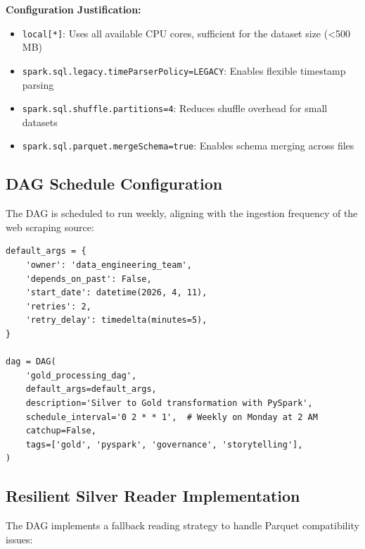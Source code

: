 \documentclass[12pt]{article}
\begin{document}
\textbf{Configuration Justification:}
\begin{itemize}
    \item \texttt{local[*]}: Uses all available CPU cores, sufficient for the dataset size (<500 MB)
    \item \texttt{spark.sql.legacy.timeParserPolicy=LEGACY}: Enables flexible timestamp parsing
    \item \texttt{spark.sql.shuffle.partitions=4}: Reduces shuffle overhead for small datasets
    \item \texttt{spark.sql.parquet.mergeSchema=true}: Enables schema merging across files
\end{itemize}

\subsection{DAG Schedule Configuration}

The DAG is scheduled to run weekly, aligning with the ingestion frequency of the web scraping source:

\begin{lstlisting}
default_args = {
    'owner': 'data_engineering_team',
    'depends_on_past': False,
    'start_date': datetime(2026, 4, 11),
    'retries': 2,
    'retry_delay': timedelta(minutes=5),
}

dag = DAG(
    'gold_processing_dag',
    default_args=default_args,
    description='Silver to Gold transformation with PySpark',
    schedule_interval='0 2 * * 1',  # Weekly on Monday at 2 AM
    catchup=False,
    tags=['gold', 'pyspark', 'governance', 'storytelling'],
)
\end{lstlisting}

\subsection{Resilient Silver Reader Implementation}

The DAG implements a fallback reading strategy to handle Parquet compatibility issues:
\end{document}
